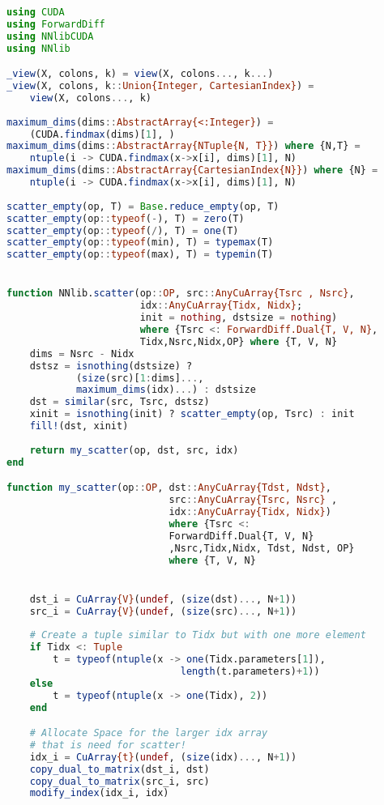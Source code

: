 \label{code_subfig}
\lstset{language=Julia,style=nonumbers}
\begin{lstlisting}[language=Julia]
using CUDA
using ForwardDiff
using NNlibCUDA
using NNlib

_view(X, colons, k) = view(X, colons..., k...)
_view(X, colons, k::Union{Integer, CartesianIndex}) = 
    view(X, colons..., k)
 
maximum_dims(dims::AbstractArray{<:Integer}) = 
    (CUDA.findmax(dims)[1], )
maximum_dims(dims::AbstractArray{NTuple{N, T}}) where {N,T} = 
    ntuple(i -> CUDA.findmax(x->x[i], dims)[1], N)
maximum_dims(dims::AbstractArray{CartesianIndex{N}}) where {N} = 
    ntuple(i -> CUDA.findmax(x->x[i], dims)[1], N)
 
scatter_empty(op, T) = Base.reduce_empty(op, T)
scatter_empty(op::typeof(-), T) = zero(T)
scatter_empty(op::typeof(/), T) = one(T)
scatter_empty(op::typeof(min), T) = typemax(T)
scatter_empty(op::typeof(max), T) = typemin(T)


function NNlib.scatter(op::OP, src::AnyCuArray{Tsrc , Nsrc}, 
                       idx::AnyCuArray{Tidx, Nidx}; 
                       init = nothing, dstsize = nothing) 
                       where {Tsrc <: ForwardDiff.Dual{T, V, N},
                       Tidx,Nsrc,Nidx,OP} where {T, V, N}
    dims = Nsrc - Nidx 
    dstsz = isnothing(dstsize) ? 
            (size(src)[1:dims]..., 
            maximum_dims(idx)...) : dstsize 
    dst = similar(src, Tsrc, dstsz) 
    xinit = isnothing(init) ? scatter_empty(op, Tsrc) : init  
    fill!(dst, xinit) 
    
    return my_scatter(op, dst, src, idx)        
end

function my_scatter(op::OP, dst::AnyCuArray{Tdst, Ndst}, 
                            src::AnyCuArray{Tsrc, Nsrc} , 
                            idx::AnyCuArray{Tidx, Nidx}) 
                            where {Tsrc <: 
                            ForwardDiff.Dual{T, V, N}
                            ,Nsrc,Tidx,Nidx, Tdst, Ndst, OP} 
                            where {T, V, N}   


    dst_i = CuArray{V}(undef, (size(dst)..., N+1)) 
    src_i = CuArray{V}(undef, (size(src)..., N+1))
    
    # Create a tuple similar to Tidx but with one more element 
    if Tidx <: Tuple
        t = typeof(ntuple(x -> one(Tidx.parameters[1]), 
                              length(t.parameters)+1))
    else
        t = typeof(ntuple(x -> one(Tidx), 2))
    end

    # Allocate Space for the larger idx array
    # that is need for scatter!
    idx_i = CuArray{t}(undef, (size(idx)..., N+1))
    copy_dual_to_matrix(dst_i, dst)
    copy_dual_to_matrix(src_i, src)
    modify_index(idx_i, idx)


\end{lstlisting}
